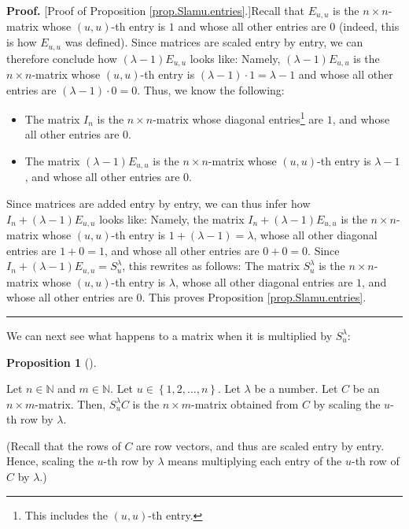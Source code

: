 \documentclass[numbers=enddot,12pt,final,onecolumn,notitlepage]{scrartcl}%
\theoremstyle{definition}
\newtheorem{prop}[theo]{Proposition}
\newenvironment{proposition}[1][]
{\begin{prop}[#1]\begin{leftbar}}
{\end{leftbar}\end{prop}}
\newenvironment{proof}[1][Proof]{\noindent\textbf{#1.} }{\ \rule{0.5em}{0.5em}}
\begin{document}
\begin{proof}
[Proof of Proposition \ref{prop.Slamu.entries}.]Recall that $E_{u,u}$ is the
$n\times n$-matrix whose $\left(  u,u\right)  $-th entry is $1$ and whose all
other entries are $0$ (indeed, this is how $E_{u,u}$ was defined). Since
matrices are scaled entry by entry, we can therefore conclude how $\left(
\lambda-1\right)  E_{u,u}$ looks like: Namely, $\left(  \lambda-1\right)
E_{u,u}$ is the $n\times n$-matrix whose $\left(  u,u\right)  $-th entry is
$\left(  \lambda-1\right)  \cdot1=\lambda-1$ and whose all other entries are
$\left(  \lambda-1\right)  \cdot0=0$. Thus, we know the following:

\begin{itemize}
\item The matrix $I_{n}$ is the $n\times n$-matrix whose diagonal
entries\footnote{This includes the $\left(  u,u\right)  $-th entry.} are $1$,
and whose all other entries are $0$.

\item The matrix $\left(  \lambda-1\right)  E_{u,u}$ is the $n\times n$-matrix
whose $\left(  u,u\right)  $-th entry is $\lambda-1$, and whose all other
entries are $0$.
\end{itemize}

Since matrices are added entry by entry, we can thus infer how $I_{n}+\left(
\lambda-1\right)  E_{u,u}$ looks like: Namely, the matrix $I_{n}+\left(
\lambda-1\right)  E_{u,u}$ is the $n\times n$-matrix whose $\left(
u,u\right)  $-th entry is $1+\left(  \lambda-1\right)  =\lambda$, whose all
other diagonal entries are $1+0=1$, and whose all other entries are $0+0=0$.
Since $I_{n}+\left(  \lambda-1\right)  E_{u,u}=S_{u}^{\lambda}$, this rewrites
as follows: The matrix $S_{u}^{\lambda}$ is the $n\times n$-matrix whose
$\left(  u,u\right)  $-th entry is $\lambda$, whose all other diagonal entries
are $1$, and whose all other entries are $0$. This proves Proposition
\ref{prop.Slamu.entries}.
\end{proof}

We can next see what happens to a matrix when it is multiplied by
$S_{u}^{\lambda}$:

\begin{proposition}
\label{prop.Slamu.laction}Let $n\in\mathbb{N}$ and $m\in\mathbb{N}$. Let
$u\in\left\{  1,2,\ldots,n\right\}  $. Let $\lambda$ be a number. Let $C$ be
an $n\times m$-matrix. Then, $S_{u}^{\lambda}C$ is the $n\times m$-matrix
obtained from $C$ by scaling the $u$-th row by $\lambda$.

(Recall that the rows of $C$ are row vectors, and thus are scaled entry by
entry. Hence, scaling the $u$-th row by $\lambda$ means multiplying each entry
of the $u$-th row of $C$ by $\lambda$.)
\end{proposition}
\end{document}
